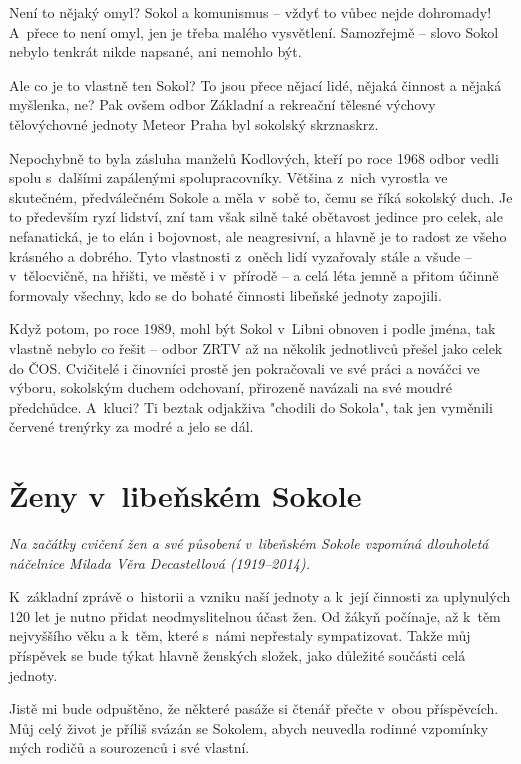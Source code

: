 \documentclass[a5paper, 11pt, twoside]{article}
\begin{document}
Není to nějaký omyl? Sokol a komunismus -- vždyť to vůbec nejde
dohromady! A~přece to není omyl, jen je třeba malého vysvětlení.
Samozřejmě -- slovo Sokol nebylo tenkrát nikde napsané, ani nemohlo být.

Ale co je to vlastně ten Sokol? To jsou přece nějací lidé, nějaká
činnost a nějaká myšlenka, ne? Pak ovšem odbor Základní a rekreační
tělesné výchovy tělovýchovné jednoty Meteor Praha byl sokolský
skrznaskrz.

Nepochybně to byla zásluha manželů Kodlových, kteří po roce 1968 odbor
vedli spolu s~dalšími zapálenými spolupracovníky. Většina z~nich
vyrostla ve skutečném, předválečném Sokole a měla v~sobě to, čemu se
říká sokolský duch. Je to především ryzí lidství, zní tam však silně
také obětavost jedince pro celek, ale nefanatická, je to elán i
bojovnost, ale neagresivní, a hlavně je to radost ze všeho krásného a
dobrého. Tyto vlastnosti z~oněch lidí vyzařovaly stále a všude --
v~tělocvičně, na hřišti, ve městě i v~přírodě -- a celá léta jemně a
přitom účinně formovaly všechny, kdo se do bohaté činnosti libeňské
jednoty zapojili.

Když potom, po roce 1989, mohl být Sokol v~Libni obnoven i podle jména,
tak vlastně nebylo co řešit -- odbor ZRTV až na několik jednotlivců
přešel jako celek do ČOS. Cvičitelé i činovníci prostě jen pokračovali
ve své práci a nováčci ve výboru, sokolským duchem odchovaní, přirozeně
navázali na své moudré předchůdce. A~kluci? Ti beztak odjakživa "chodili
do Sokola", tak jen vyměnili červené trenýrky za modré a jelo se dál.

\section{Ženy v~libeňském
Sokole}

\begin{center}
  \textit{Na začátky cvičení žen a své působení v~libeňském Sokole vzpomíná dlouholetá náčelnice Milada Věra Decastellová (1919--2014).}
\end{center}

K~základní zprávě o~historii a vzniku naší jednoty a k~její činnosti za
uplynulých 120 let je nutno přidat neodmyslitelnou účast žen. Od žákyň
počínaje, až k~těm nejvyššího věku a k~těm, které s~námi nepřestaly
sympatizovat. Takže můj příspěvek se bude týkat hlavně ženských složek,
jako důležité součásti celá jednoty.

Jistě mi bude odpuštěno, že některé pasáže si čtenář přečte v~obou
příspěvcích. Můj celý život je příliš svázán se Sokolem, abych neuvedla
rodinné vzpomínky mých rodičů a sourozenců i své vlastní.
\end{document}
